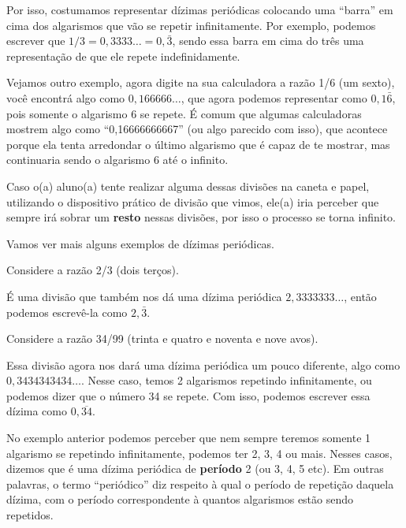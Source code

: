 Por isso, costumamos representar dízimas periódicas colocando uma ``barra'' em cima dos algarismos que vão se repetir infinitamente. Por exemplo, podemos escrever que \(1/3=0,3333\dots=0,\bar{3}\), sendo essa barra em cima do três uma representação de que ele repete indefinidamente.

Vejamos outro exemplo, agora digite na sua calculadora a razão 1/6 (um sexto), você encontrá algo como \(0,166666\dots\), que agora podemos representar como \(0,1\bar{6}\), pois somente o algarismo 6 se repete. É comum que algumas calculadoras mostrem algo como ``0,16666666667'' (ou algo parecido com isso), que acontece porque ela tenta arredondar o último algarismo que é capaz de te mostrar, mas continuaria sendo o algarismo 6 até o infinito.

Caso o(a) aluno(a) tente realizar alguma dessas divisões na caneta e papel, utilizando o dispositivo prático de divisão que vimos, ele(a) iria perceber que sempre irá sobrar um \textbf{resto} nessas divisões, por isso o processo se torna infinito.

Vamos ver mais alguns exemplos de dízimas periódicas.

\begin{exemplo}
    Considere a razão 2/3 (dois terços).

    \vspace{0.5cm}

    É uma divisão que também nos dá uma dízima periódica \(2,3333333\dots\), então podemos escrevê-la como \(2,\bar{3}\).
\end{exemplo}

\begin{exemplo}
    Considere a razão 34/99 (trinta e quatro e noventa e nove avos).

    \vspace{0.5cm}

    Essa divisão agora nos dará uma dízima periódica um pouco diferente, algo como \(0,3434343434\dots\). Nesse caso, temos 2 algarismos repetindo infinitamente, ou podemos dizer que o número 34 se repete. Com isso, podemos escrever essa dízima como \(0,\overline{34}\).
\end{exemplo}

No exemplo anterior podemos perceber que nem sempre teremos somente 1 algarismo se repetindo infinitamente, podemos ter 2, 3, 4 ou mais. Nesses casos, dizemos que é uma dízima periódica de \textbf{período} 2 (ou 3, 4, 5 etc). Em outras palavras, o termo ``periódico'' diz respeito à qual o período de repetição daquela dízima, com o período correspondente à quantos algarismos estão sendo repetidos.

